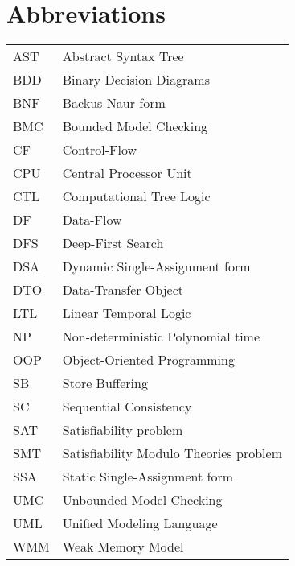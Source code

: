\chapter*{Abbreviations}


\noindent
\begin{longtable}{@{}p{}p{}@{}}
AST & Abstract Syntax Tree \\
BDD & Binary Decision Diagrams \\
BNF & Backus-Naur form \\
BMC & Bounded Model Checking \\
CF  & Control-Flow \\
CPU & Central Processor Unit \\
CTL & Computational Tree Logic \\
DF  & Data-Flow \\
DFS & Deep-First Search \\
DSA & Dynamic Single-Assignment form \\
DTO & Data-Transfer Object \\
LTL & Linear Temporal Logic \\
NP  & Non-deterministic Polynomial time \\
OOP & Object-Oriented Programming \\
SB  & Store Buffering \\
SC  & Sequential Consistency \\
SAT & Satisfiability problem \\
SMT & Satisfiability Modulo Theories problem \\
SSA & Static Single-Assignment form \\
UMC & Unbounded Model Checking \\
UML & Unified Modeling Language \\
WMM & Weak Memory Model \\
\end{longtable}

